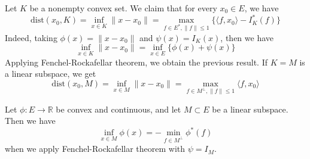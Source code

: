 \begin{exmp} Let $K$ be a nonempty convex set. We  claim that for every $x_0\in E$, we have
\begin{equation}
    \textrm{dist}(x_0,K)=\inf_{x\in K}\|x-x_0\|=\max_{f\in E^*,\|f\|\leq 1}\{\langle f,x_0\rangle-I_K^*(f)\}
\end{equation}
Indeed, taking $\phi(x)=\|x-x_0\|$ and $\psi(x)=I_K(x)$, then we have 
\begin{equation}
    \inf_{x\in K}\|x-x_0\|=\inf_{x\in E}\{\phi(x)+\psi(x)\}
\end{equation}
Applying Fenchel-Rockafellar theorem, we obtain the previous result. If $K=M$ is a linear subspace, we get
\begin{equation}
    \textrm{dist}(x_0,M)=\inf_{x\in M}\|x-x_0\|=\max_{f\in M^\perp,\|f\|\leq 1}\langle f,x_0\rangle
\end{equation}
\end{exmp}

\begin{exmp} Let $\phi:E\rightarrow \mathbb{R}$ be convex and continuous, and let $M\subset E$ be a linear subspace. Then we have
\begin{equation}
    \inf_{x\in M} \phi(x)=-\min_{f\in M^\perp}\phi^*(f)
\end{equation}
when we apply Fenchel-Rockafellar theorem with $\psi=I_M$.
\end{exmp}

